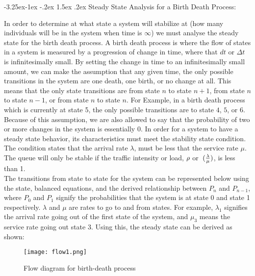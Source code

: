 \documentclass[11pt]{article}
\makeatletter
\renewcommand\subsection{\@startsection{subsection}{2}{\z@}%
                                         {-3.25ex\@plus -1ex \@minus -.2ex}%
                                         {1.5ex \@plus .2ex}%
                                         {\normalfont\fontfamily{phv}\fontsize{14}{17}\bfseries}}
\makeatother
\begin{document}
\subsection{Steady State Analysis for a Birth Death Process:} \label{s:numerical}

In order to determine at what state a system will stabilize at (how many individuals will be in the system when time is $\infty$) we must analyse the steady state for the birth death process. A birth death process is where the flow of states in a system is measured by a progression of change in time, where that $dt$ or $\Delta t$ is infinitesimally small. By setting the change in time to an infinitesimally small amount, we can make the assumption that any given time, the only possible transitions in the system are one death, one birth, or no change at all. This means that the only state transitions are from state $n$ to state $n+1$, from state $n$ to state $n-1$, or from state $n$ to state $n$. For Example, in a birth death process which is currently at state 5, the only possible transitions are to state $4$, $5$, or $6$. Because of this assumption, we are also allowed to say that the probability of two or more changes in the system is essentially 0. In order for a system to have a steady state behavior, its characteristics must meet the stability state condition. The condition states that the arrival rate $\lambda$, must be less that the service rate $\mu$. The queue will only be stable if the traffic intensity or load, $\rho \hspace{1mm}$or $\hspace{1mm} (\frac{\lambda}{\mu})$, is less than 1.\\ The transitions from state to state for the system can be represented below using the state, balanced equations, and the derived relationship between $P_{n}$ and $P_{n-1}$, where $P_{0}$ and $P_{1}$ signify the probabilities that the system is at state 0 and state 1 respectively. $\lambda$ and $\mu$ are rates to go to and from states. For example, $\lambda_1$ signifies the arrival rate going out of the first state of the system, and $\mu_3$ means the service rate going out state 3. Using this, the steady state can be derived as shown:
\begin{figure}
    \centering
    \texttt{[image: flow1.png]}
    \caption{Flow diagram for birth-death process}
    \label{flow1}
\end{figure}\\
\end{document}
